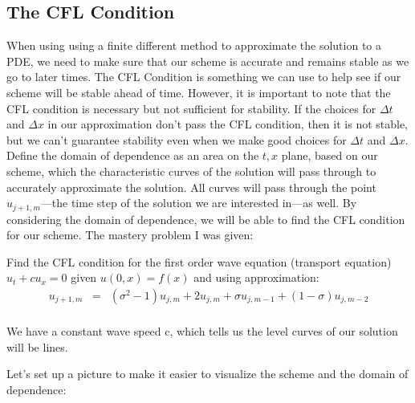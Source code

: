 \documentclass{article}
\newcommand{\bea}{\begin{eqnarray*}}
\newcommand{\eea}{\end{eqnarray*}}
\newcommand{\blue}[1]{\textcolor{blue}{#1}}
\begin{document}
 \subsection{The CFL Condition}
When using using a finite different method to approximate the solution to a PDE, we need to make sure that our scheme is accurate and remains stable as we go to later times. The CFL Condition is something we can use to help see if our scheme will be stable ahead of time. However, it is important to note that the CFL condition is necessary but not sufficient for stability. If the choices for $\Delta t$ and $\Delta x$ in our approximation don't pass the CFL condition, then it is not stable, but we can't guarantee stability even when we make good choices for $\Delta t$ and $\Delta x$. \newline
\newline
Define the domain of dependence as an area on the $t,x$ plane, based on our scheme, which the characteristic curves of the solution will pass through to accurately approximate the solution. All curves will pass through the point $u_{j+1,m}$---the time step of the solution we are interested in---as well. By considering the domain of dependence, we will be able to find the CFL condition for our scheme.\newline
\newline
The mastery problem I was given: \newline

Find the CFL condition for the first order wave equation (transport equation) $u_t+cu_x = 0$ given $u(0,x)=f(x)$ and using approximation:
\bea
 u_{j+1,m} &=& (\sigma^2-1)u_{j,m} + 2u_{j,m} + \sigma u_{j,m-1} + (1-\sigma)u_{j,m-2}\\
\eea

We have a constant wave speed c, which tells us the level curves of our solution will be lines. \newline 

Let's set up a picture to make it easier to visualize the scheme and the domain of dependence:
\end{document}
